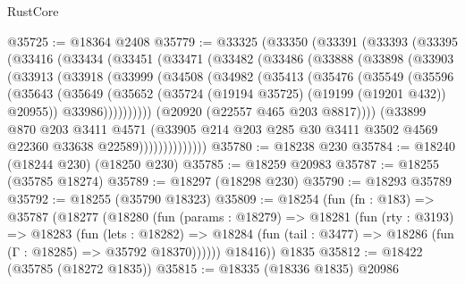 \begin{lexlean}{RustCore}
\begin{coremodule}
@35725 := @18364 @2408
@35779 := @33325
    (@33350
      (@33391
        (@33393
          (@33395
            (@33416
              (@33434
                (@33451
                  (@33471
                    (@33482
                      (@33486
                        (@33888
                          (@33898
                            (@33903
                              (@33913
                                (@33918
                                  (@33999
                                    (@34508
                                      (@34982
                                        (@35413
                                          (@35476
                                            (@35549
                                              (@35596
                                                (@35643
                                                  (@35649
                                                    (@35652
                                                      (@35724
                                                        (@19194 @35725)
                                                        (@19199 (@19201 @432))
                                                        @20955))
                                                    @33986))))))))))
                                (@20920 (@22557 @465 @203 @8817))))
                            (@33899
                              @870
                              @203
                              @3411
                              @4571
                              (@33905
                                @214
                                @203
                                @285
                                @30
                                @3411
                                @3502
                                @4569
                                @22360
                                @33638
                                @22589))))))))))))))
@35780 := @18238 @230
@35784 := @18240 (@18244 @230) (@18250 @230)
@35785 := @18259 @20983
@35787 := @18255 (@35785 @18274)
@35789 := @18297 (@18298 @230)
@35790 := @18293 @35789
@35792 := @18255 (@35790 @18323)
@35809 := @18254
    (fun (fn : @183) =>
    @35787
      (@18277
        (@18280
          (fun (params : @18279) =>
          @18281
            (fun (rty : @3193) =>
            @18283
              (fun (lets : @18282) =>
              @18284 (fun (tail : @3477) => @18286 (fun (Γ : @18285) => @35792 @18370))))))
        @18416))
    @1835
@35812 := @18422 (@35785 (@18272 @1835))
@35815 := @18335 (@18336 @1835) @20986

\end{coremodule}
\end{lexlean}
